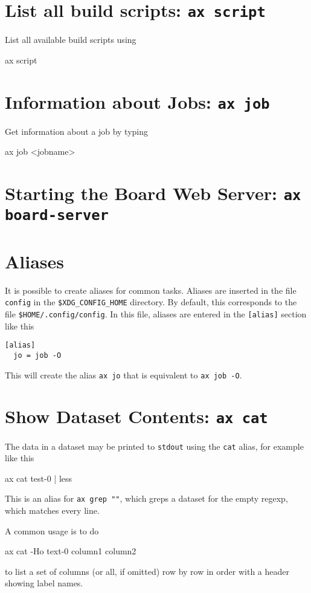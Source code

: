 \begin{shell}
\section{List all build scripts: \texttt{ax script}}
List all available build scripts using
\begin{shell}
ax script
\end{shell}


\section{Information about Jobs: \texttt{ax job}}
Get information about a job by typing
\begin{shell}
ax job <jobname>
\end{shell}


\section{Starting the Board Web Server: \texttt{ax board-server}}



\section{Aliases}
It is possible to create aliases for common tasks.  Aliases are
inserted in the file \texttt{config} in the \texttt{\$XDG\_CONFIG\_HOME}
directory.  By default, this corresponds to the file \texttt{\$HOME/.config/config}.
In this file, aliases are entered in the \texttt{[alias]} section like this
\begin{verbatim}
[alias]
  jo = job -O
\end{verbatim}
This will create the alias \texttt{ax jo} that is equivalent to
\texttt{ax job -O}.



\section{Show Dataset Contents: \texttt{ax cat}}
The data in a dataset may be printed to \texttt{stdout} using the
\texttt{cat} alias, for example like this
\begin{shell}
ax cat test-0 | less
\end{shell}
This is an alias for \texttt{ax grep ""}, which greps a dataset for the
empty regexp, which matches every line.

A common usage is to do
\begin{shell}
ax cat -Ho text-0 column1 column2
\end{shell}
to list a set of columns (or all, if omitted) row by row in order with
a header showing label names.




\end{shell}
